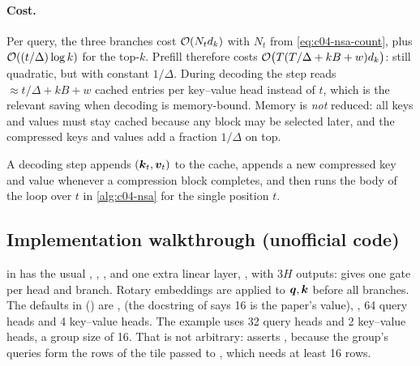 \paragraph{Cost.}
Per query, the three branches cost $\mathcal{O}(N_td_k)$ with $N_t$ from \eqref{eq:c04-nsa-count},
plus $\mathcal{O}((t/\Delta)\log k)$ for the top-$k$. Prefill therefore costs
$\mathcal{O}\big(T(T/\Delta+kB+w)d_k\big)$: still quadratic, but with constant $1/\Delta$. During
decoding the step reads $\approx t/\Delta+kB+w$ cached entries per key--value head instead of $t$,
which is the relevant saving when decoding is memory-bound. Memory is \emph{not} reduced: all
keys and values must stay cached because any block may be selected later, and the compressed
keys and values add a fraction $1/\Delta$ on top.

A decoding step appends $(\bm{k}_t,\bm{v}_t)$ to the cache, appends a new compressed key and value
whenever a compression block completes, and then runs the body of the loop over $t$ in
\cref{alg:c04-nsa} for the single position $t$.

\subsection{Implementation walkthrough (unofficial \fla{} code)}

\begin{implnote}[title={In the code: the attention module and its defaults}]
 in
 has the
usual , , ,  and one extra linear layer,
, with $3H$ outputs:  gives one
gate per head and branch. Rotary embeddings are applied to $\bm{q},\bm{k}$ before all branches. The
defaults in 
()
are ,  (the docstring of  says 16 is
the paper's value), , 64 query heads and 4 key--value heads. The example
 uses 32 query heads and 2
key--value heads, a group size of 16. That is not arbitrary:  asserts
, because the group's queries form the rows of
the tile passed to , which needs at least 16 rows.
\end{implnote}

